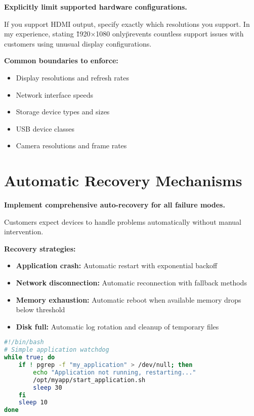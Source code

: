 \textbf{Explicitly limit supported hardware configurations.}

If you support HDMI output, specify exactly which resolutions you support. In my experience, stating \"1920×1080 only\" prevents countless support issues with customers using unusual display configurations.

\textbf{Common boundaries to enforce:}
\begin{itemize}
\item Display resolutions and refresh rates
\item Network interface speeds
\item Storage device types and sizes
\item USB device classes
\item Camera resolutions and frame rates
\end{itemize}

\section{Automatic Recovery Mechanisms}

\textbf{Implement comprehensive auto-recovery for all failure modes.}

Customers expect devices to handle problems automatically without manual intervention.

\textbf{Recovery strategies:}
\begin{itemize}
\item \textbf{Application crash:} Automatic restart with exponential backoff
\item \textbf{Network disconnection:} Automatic reconnection with fallback methods
\item \textbf{Memory exhaustion:} Automatic reboot when available memory drops below threshold
\item \textbf{Disk full:} Automatic log rotation and cleanup of temporary files
\end{itemize}

\begin{tcolorbox}[colback=gray!5,colframe=gray!50,title=Watchdog Implementation]
\begin{lstlisting}[language=bash,basicstyle=\small\ttfamily]
#!/bin/bash
# Simple application watchdog
while true; do
    if ! pgrep -f "my_application" > /dev/null; then
        echo "Application not running, restarting..."
        /opt/myapp/start_application.sh
        sleep 30
    fi
    sleep 10
done
\end{lstlisting}
\end{tcolorbox}

